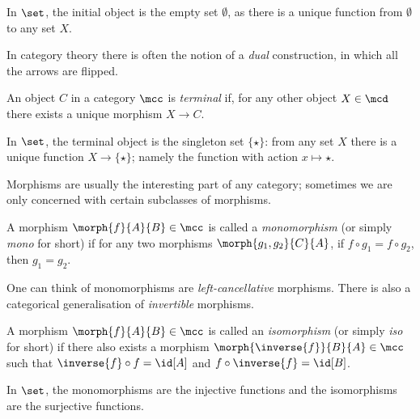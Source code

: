 \begin{example}
    In \(\set\), the initial object is the empty set \(\emptyset\), as there is
    a unique function from \(\emptyset\) to any set \(X\).
\end{example}

In category theory there is often the notion of a \emph{dual} construction, in
which all the arrows are flipped.

\begin{definition}
    An object \(C\) in a category \(\mcc\) is \emph{terminal} if, for any other
    object \(X \in \mcd\) there exists a unique morphism \(X \to C\).
\end{definition}

\begin{example}
    In \(\set\), the terminal object is the singleton set \(\{\star\}\):
    from any set \(X\) there is a unique function \(X \to \{\star\}\); namely
    the function with action \(x \mapsto \star\).
\end{example}

Morphisms are usually the interesting part of any category; sometimes we are
only concerned with certain subclasses of morphisms.

\begin{definition}[Monomorphism]
    A morphism \(\morph{f}{A}{B} \in \mcc\) is called a \emph{monomorphism} (or
    simply \emph{mono} for short) if for any two morphisms
    \(\morph{g_1,g_2}{C}{A}\), if \(f \circ g_1 = f \circ g_2\), then
    \(g_1 = g_2\).
\end{definition}

One can think of monomorphisms are \emph{left-cancellative} morphisms.
There is also a categorical generalisation of \emph{invertible} morphisms.

\begin{definition}[Isomorphism]
    A morphism \(\morph{f}{A}{B} \in \mcc\) is called an \emph{isomorphism} (or
    simply \emph{iso} for short) if there also exists a morphism \(
        \morph{\inverse{f}}{B}{A} \in \mcc
    \) such that \(
        \inverse{f} \circ f = \id[A]
    \) and \(
        f \circ \inverse{f} = \id[B]
    \).
\end{definition}

\begin{example}
    In \(\set\), the monomorphisms are the injective functions and the
    isomorphisms are the surjective functions.
\end{example}

